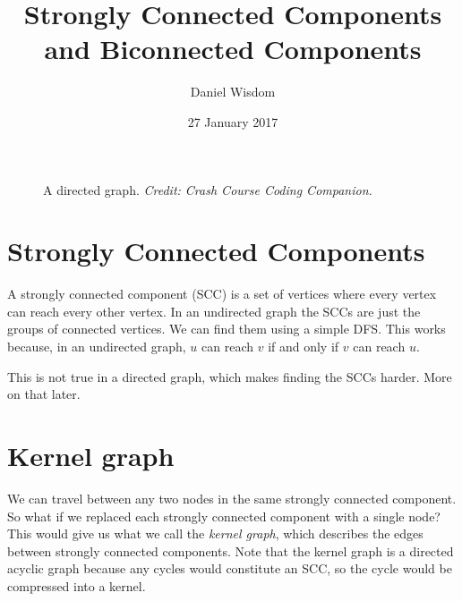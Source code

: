 \documentclass{article}
\title{Strongly Connected Components and Biconnected Components}
\author{Daniel Wisdom}
\date{27 January 2017}
\begin{document}
\maketitle


\begin{figure}[h]
\center
{}
\caption{A directed graph. \textit{Credit: Crash Course Coding Companion.}}
\end{figure}

\section{Strongly Connected Components}

A strongly connected component (SCC) is a set of vertices where every vertex can reach every other vertex.  In an undirected graph the SCCs are just the groups of connected vertices.  We can find them using a simple DFS.  This works because, in an undirected graph, $u$ can reach $v$ if and only if $v$ can reach $u$.

This is not true in a directed graph, which makes finding the SCCs harder.  More on that later.

\section{Kernel graph}

We can travel between any two nodes in the same strongly connected component. So what if we replaced each strongly connected component with a single node? This would give us what we call the \textit{kernel graph}, which describes the edges between strongly connected components. Note that the kernel graph is a directed acyclic graph because any cycles would constitute an SCC, so the cycle would be compressed into a kernel.
\end{document}
